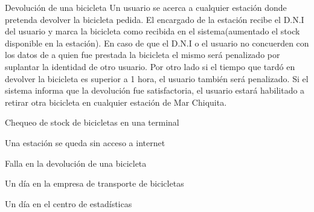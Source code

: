 \begin{subsection}{Devolución de una bicicleta}
Un usuario se acerca a cualquier estación donde pretenda devolver la bicicleta pedida. El encargado de la estación
recibe el D.N.I del usuario y marca la bicicleta como recibida en el sistema(aumentado el stock disponible en la estación). En caso de que el D.N.I o el usuario no concuerden con los datos de a quien fue prestada la bicicleta el mismo será penalizado por suplantar la identidad de otro usuario. Por otro lado si el tiempo que tardó en devolver la bicicleta es superior a 1 hora, el usuario también será penalizado. Si el sistema informa que la devolución fue satisfactoria, el usuario estará habilitado a retirar otra bicicleta en cualquier estación de Mar Chiquita.

\end{subsection}

\begin{subsection}{Chequeo de stock de bicicletas en una terminal}

\end{subsection}

\begin{subsection}{Una estación se queda sin acceso a internet}

\end{subsection}

\begin{subsection}{Falla en la devolución de una bicicleta}

\end{subsection} 

\begin{subsection}{Un día en la empresa de transporte de bicicletas}

\end{subsection}

\begin{subsection}{Un día en el centro de estadísticas}

\end{subsection}